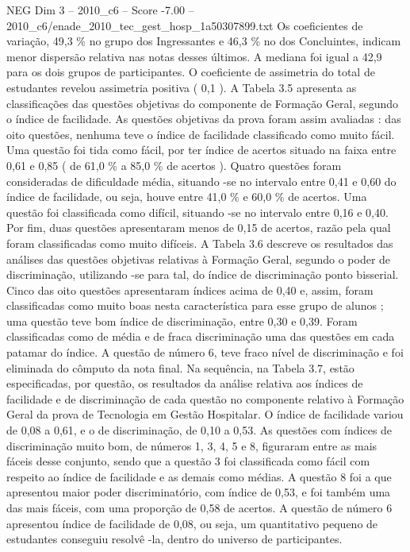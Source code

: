 \begin{textsample}{NEG Dim 3 – 2010\_c6 – Score -7.00 – 2010\_c6/enade\_2010\_tec\_gest\_hosp\_1a50307899.txt}
Os coeficientes de variação, 49,3 \% no grupo dos Ingressantes e 46,3 \% no dos Concluintes, indicam menor dispersão relativa nas notas desses últimos.
A mediana foi igual a 42,9 para os dois grupos de participantes.
O coeficiente de assimetria do total de estudantes revelou assimetria positiva ( 0,1 ).
A Tabela 3.5 apresenta as classificações das questões objetivas do componente de Formação Geral, segundo o índice de facilidade.
As questões objetivas da prova foram assim avaliadas : das oito questões, nenhuma teve o índice de facilidade classificado como muito fácil.
Uma questão foi tida como fácil, por ter índice de acertos situado na faixa entre 0,61 e 0,85 ( de 61,0 \% a 85,0 \% de acertos ).
Quatro questões foram consideradas de dificuldade média, situando -se no intervalo entre 0,41 e 0,60 do índice de facilidade, ou seja, houve entre 41,0 \% e 60,0 \% de acertos.
Uma questão foi classificada como difícil, situando -se no intervalo entre 0,16 e 0,40.
Por fim, duas questões apresentaram menos de 0,15 de acertos, razão pela qual foram classificadas como muito difíceis.
A Tabela 3.6 descreve os resultados das análises das questões objetivas relativas à Formação Geral, segundo o poder de discriminação, utilizando -se para tal, do índice de discriminação ponto bisserial.
Cinco das oito questões apresentaram índices acima de 0,40 e, assim, foram classificadas como muito boas nesta característica para esse grupo de alunos ; uma questão teve bom índice de discriminação, entre 0,30 e 0,39.
Foram classificadas como de média e de fraca discriminação uma das questões em cada patamar do índice.
A questão de número 6, teve fraco nível de discriminação e foi eliminada do cômputo da nota final.
Na sequência, na Tabela 3.7, estão especificadas, por questão, os resultados da análise relativa aos índices de facilidade e de discriminação de cada questão no componente relativo à Formação Geral da prova de Tecnologia em Gestão Hospitalar.
O índice de facilidade variou de 0,08 a 0,61, e o de discriminação, de 0,10 a 0,53.
As questões com índices de discriminação muito bom, de números 1, 3, 4, 5 e 8, figuraram entre as mais fáceis desse conjunto, sendo que a questão 3 foi classificada como fácil com respeito ao índice de facilidade e as demais como médias.
A questão 8 foi a que apresentou maior poder discriminatório, com índice de 0,53, e foi também uma das mais fáceis, com uma proporção de 0,58 de acertos.
A questão de número 6 apresentou índice de facilidade de 0,08, ou seja, um quantitativo pequeno de estudantes conseguiu resolvê -la, dentro do universo de participantes.

\end{textsample}
